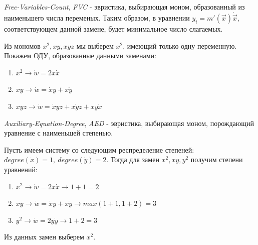 \begin{heuristics} \label{FVC}
    \textit{Free-Variables-Count}, \textit{FVC} - эвристика, выбирающая моном, образованный из наименьшего числа    переменых. Таким образом, в уравнении $y_i = m'(\vec x) \dot{\vec x}$, соответствующем данной замене, будет минимальное число слагаемых.
    
    \begin{example}
        Из мономов $x^2, xy, xyz$ мы выберем $x^2$, имеющий только одну переменную. Покажем ОДУ, образованные данными заменами:
        \begin{enumerate}
            \item $x^2 \longrightarrow \dot w = 2x \dot x$
            \item $xy \longrightarrow \dot w = \dot x y + x \dot y$
            \item $xyz \longrightarrow \dot w = \dot x yz + x \dot y z + xy \dot x$
        \end{enumerate}
    \end{example}
\end{heuristics}

\begin{heuristics} \label{AED}
    \textit{Auxiliary-Equation-Degree}, \textit{AED} - эвристика, выбирающая моном, порождающий уравнение с наименьшей степенью. 
    
    \begin{example}
        Пусть имеем систему со следующим респределение степеней: $degree(\dot x) = 1,\ degree(\dot y) = 2$. Тогда для замен $x^2, xy, y^2$ получим степени уравнений:
        \begin{enumerate}
            \item $x^2 \longrightarrow \dot w = 2x \dot x \longrightarrow 1 + 1 = 2$
            \item $xy \longrightarrow \dot w = \dot x y + x \dot y \longrightarrow max(1 + 1, 1 + 2) = 3$
            \item $y^2 \longrightarrow \dot w = 2y \dot y \longrightarrow 1 + 2 = 3$
        \end{enumerate}
        Из данных замен выберем $x^2$.
    \end{example}
\end{heuristics}

